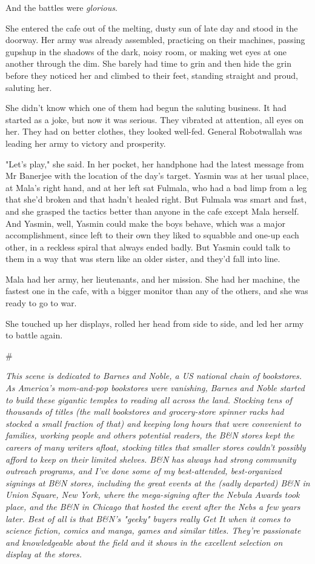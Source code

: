 And the battles were \emph{glorious}.

She entered the cafe out of the melting, dusty sun of late day and
stood in the doorway. Her army was already assembled, practicing on
their machines, passing gupshup in the shadows of the dark, noisy
room, or making wet eyes at one another through the dim. She barely
had time to grin and then hide the grin before they noticed her and
climbed to their feet, standing straight and proud, saluting her.

She didn't know which one of them had begun the saluting business.
It had started as a joke, but now it was serious. They vibrated at
attention, all eyes on her. They had on better clothes, they looked
well-fed. General Robotwallah was leading her army to victory and
prosperity.

"Let's play," she said. In her pocket, her handphone had the latest
message from Mr Banerjee with the location of the day's target.
Yasmin was at her usual place, at Mala's right hand, and at her
left sat Fulmala, who had a bad limp from a leg that she'd broken
and that hadn't healed right. But Fulmala was smart and fast, and
she grasped the tactics better than anyone in the cafe except Mala
herself. And Yasmin, well, Yasmin could make the boys behave, which
was a major accomplishment, since left to their own they liked to
squabble and one-up each other, in a reckless spiral that always
ended badly. But Yasmin could talk to them in a way that was stern
like an older sister, and they'd fall into line.

Mala had her army, her lieutenants, and her mission. She had her
machine, the fastest one in the cafe, with a bigger monitor than
any of the others, and she was ready to go to war.

She touched up her displays, rolled her head from side to side, and
led her army to battle again.

\#

\emph{This scene is dedicated to Barnes and Noble, a US national chain of bookstores. As America's mom-and-pop bookstores were vanishing, Barnes and Noble started to build these gigantic temples to reading all across the land. Stocking tens of thousands of titles (the mall bookstores and grocery-store spinner racks had stocked a small fraction of that) and keeping long hours that were convenient to families, working people and others potential readers, the B\&N stores kept the careers of many writers afloat, stocking titles that smaller stores couldn't possibly afford to keep on their limited shelves. B\&N has always had strong community outreach programs, and I've done some of my best-attended, best-organized signings at B\&N stores, including the great events at the (sadly departed) B\&N in Union Square, New York, where the mega-signing after the Nebula Awards took place, and the B\&N in Chicago that hosted the event after the Nebs a few years later. Best of all is that B\&N's "geeky" buyers really Get It when it comes to science fiction, comics and manga, games and similar titles. They're passionate and knowledgeable about the field and it shows in the excellent selection on display at the stores.}

